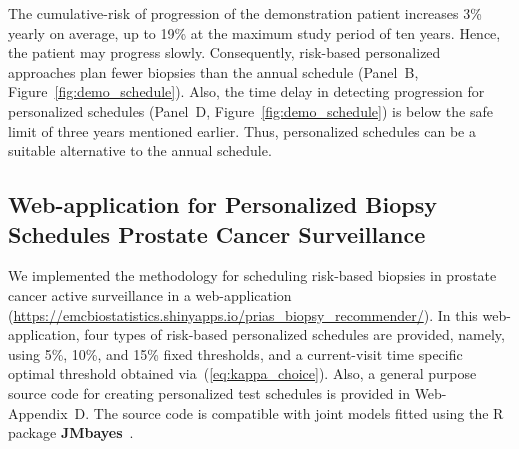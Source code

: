 The cumulative-risk of progression of the demonstration patient increases 3\% yearly on average, up to 19\% at the maximum study period of ten years. Hence, the patient may progress slowly. Consequently, risk-based personalized approaches plan fewer biopsies than the annual schedule (Panel~B, Figure~\ref{fig:demo_schedule}). Also, the time delay in detecting progression for personalized schedules (Panel~D, Figure~\ref{fig:demo_schedule}) is below the safe limit of three years mentioned earlier. Thus, personalized schedules can be a suitable alternative to the annual schedule.

\subsection{Web-application for Personalized Biopsy Schedules Prostate Cancer Surveillance}
We implemented the methodology for scheduling risk-based biopsies in prostate cancer active surveillance in a web-application (\url{https://emcbiostatistics.shinyapps.io/prias\_biopsy\_recommender/}). In this web-application, four types of risk-based personalized schedules are provided, namely, using 5\%, 10\%, and 15\% fixed thresholds, and a current-visit time specific optimal threshold obtained via~(\ref{eq:kappa_choice}). Also, a general purpose source code for creating personalized test schedules is provided in Web-Appendix~D. The source code is compatible with joint models fitted using the R package \textbf{JMbayes}~\citep{rizopoulosJMbayes}.